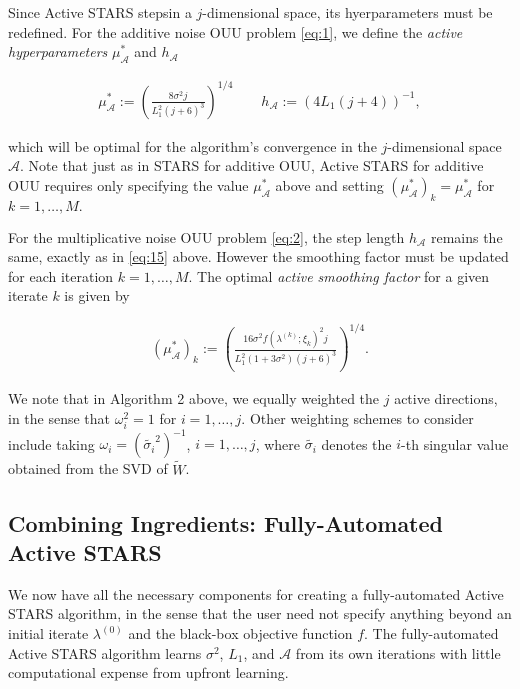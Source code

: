 \documentclass{amsart}
\newcommand{\A}{\mathcal{A}}
\begin{document}
\vspace{.25cm}

Since Active STARS stepsin a $j$-dimensional space, its hyerparameters must be redefined. For the additive noise OUU problem \eqref{eq:1}, we define the \textit{active hyperparameters} $\mu_\A^*$ and $h_\A$

\begin{eqnarray} \label{eq:16}
\mu_\A^*:=\left( \frac{8\sigma^2 j}{L_1^2(j+6)^3}\right)^{1/4} \quad \quad h_\A:=(4L_1(j+4))^{-1},
\end{eqnarray} 

\noindent which will be optimal \cite{CW} for the algorithm's convergence in the $j$-dimensional space $\A.$ Note that just as in STARS for additive OUU, Active STARS for additive OUU requires only specifying the value $\mu_\A^*$ above and setting $(\mu^*_\A)_k=\mu_\A^*$ for $k=1,\ldots, M.$

For the multiplicative noise OUU problem \eqref{eq:2}, the step length $h_\A$ remains the same, exactly as in \eqref{eq:15} above. However the smoothing factor must be updated for each iteration $k=1,\ldots, M.$ The optimal \textit{active smoothing factor} for a given iterate $k$ is given by

\begin{eqnarray} \label{eq:17}
(\mu_\A^*)_k:=\left( \frac{16 \sigma^2 f(\lambda^{(k)};\xi_k)^2 j}{L_1^2(1+3\sigma^2)(j+6)^3}\right)^{1/4}.
\end{eqnarray} 



We note that in Algorithm 2 above, we equally weighted the $j$ active directions, in the sense that $\omega_i^2=1$ for $i=1,\ldots,j$. Other weighting schemes to consider include taking $\omega_i=(\tilde{\sigma_i}^2)^{-1}$, $i=1,\ldots,j$, where $\tilde{\sigma_i}$ denotes the $i$-th singular value obtained from the SVD of $\tilde{W}$.




\subsection{Combining Ingredients: Fully-Automated Active STARS} We now have all the necessary components for creating a fully-automated Active STARS algorithm, in the sense that the user need not specify anything beyond an initial iterate $\lambda^{(0)}$ and the black-box objective function $f$. The fully-automated Active STARS algorithm learns $\sigma^2$, $L_1$, and $\A$ from its own iterations with little computational expense from upfront learning.
\end{document}
